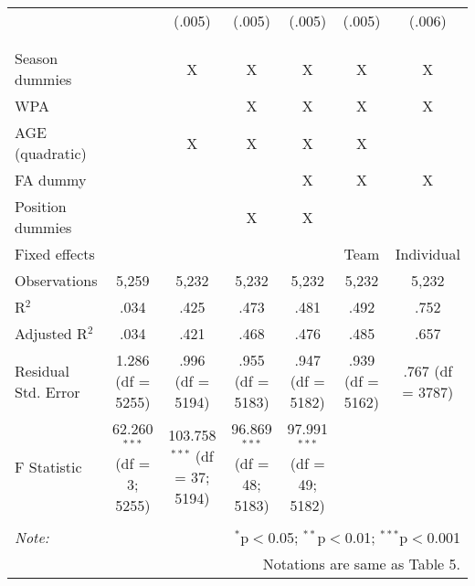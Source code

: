 \begin{table}[H]
\begin{tabular}{@{\extracolsep{5pt}}lcccccc}
  &  & (.005) & (.005) & (.005) & (.005) & (.006) \\
  & & & & & & \\
\hline \\[-1.8ex]
Season dummies &  & X & X & X & X & X \\
WPA &  &  & X & X & X & X \\
AGE (quadratic) &  & X & X & X & X &  \\
FA dummy &  &  &  & X & X & X \\
Position dummies &  &  & X & X &  &  \\
Fixed effects &  &  &  &  & Team & Individual \\
Observations & 5,259 & 5,232 & 5,232 & 5,232 & 5,232 & 5,232 \\
R$^{2}$ & .034 & .425 & .473 & .481 & .492 & .752 \\
Adjusted R$^{2}$ & .034 & .421 & .468 & .476 & .485 & .657 \\
Residual Std. Error & 1.286 (df = 5255) & .996 (df = 5194) & .955 (df = 5183) & .947 (df = 5182) & .939 (df = 5162) & .767 (df = 3787) \\
F Statistic & 62.260$^{***}$ (df = 3; 5255) & 103.758$^{***}$ (df = 37; 5194) & 96.869$^{***}$ (df = 48; 5183) & 97.991$^{***}$ (df = 49; 5182) &  &  \\
\hline
\hline \\[-1.8ex]
\textit{Note:}  & \multicolumn{6}{r}{$^{*}$p$<$0.05; $^{**}$p$<$0.01; $^{***}$p$<$0.001} \\
& \multicolumn{6}{r}{Notations are same as Table 5.} \\
\end{tabular}
\end{table}
